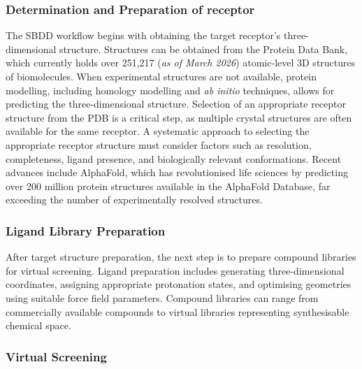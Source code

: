 \documentclass[12pt]{article}
\begin{document}
\subsubsection{Determination and Preparation of receptor}

The SBDD workflow begins with obtaining the target receptor's three-dimensional structure. Structures can be obtained from the Protein Data Bank, which currently holds over 251,217 (\textit{as of March 2026}) atomic-level 3D structures of biomolecules. When experimental structures are not available, protein modelling, including homology modelling and \textit{ab initio} techniques, allows for predicting the three-dimensional structure. Selection of an appropriate receptor structure from the PDB is a critical step, as multiple crystal structures are often available for the same receptor. A systematic approach to selecting the appropriate receptor structure must consider factors such as resolution, completeness, ligand presence, and biologically relevant conformations. Recent advances include AlphaFold\cite{CH1_15}, which has revolutionised life sciences by predicting over 200 million protein structures available in the AlphaFold Database, far exceeding the number of experimentally resolved structures.



\subsubsection{Ligand Library Preparation}

After target structure preparation, the next step is to prepare compound libraries for virtual screening. Ligand preparation includes generating three-dimensional coordinates, assigning appropriate protonation states, and optimising geometries using suitable force field parameters. Compound libraries can range from commercially available compounds to virtual libraries representing synthesisable chemical space.



\subsubsection{Virtual Screening}
\end{document}
